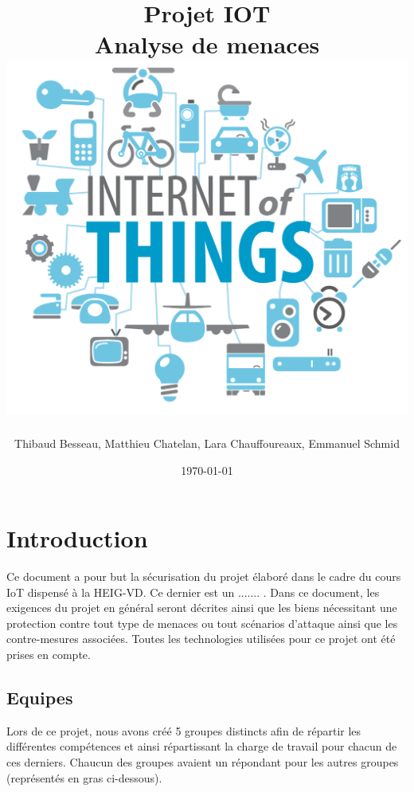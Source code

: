 \documentclass[12pt]{article}
\title{
  \vspace{-0.5cm}
  \huge{Projet IOT} \\
  \vspace{5mm}
  \Large{Analyse de menaces} \\
  \vspace{2.5cm}
  \includegraphics[width=.7\textwidth]{logo}
  \vspace{3cm}
}
\author{Thibaud Besseau, Matthieu Chatelan, Lara Chauffoureaux, Emmanuel Schmid}
\date{\today}
\begin{document}
\maketitle
\thispagestyle{empty}
\clearpage
\tableofcontents
\clearpage
\listoffigures
\clearpage
\headsep=20pt

\section{Introduction}
Ce document a pour but la sécurisation du projet élaboré dans le cadre du cours IoT dispensé à la HEIG-VD. Ce dernier est un ....... . Dans ce document, les exigences du projet en général seront décrites ainsi que les biens nécessitant une protection contre tout type de menaces ou tout scénarios d'attaque ainsi que les contre-mesures associées. Toutes les technologies utilisées pour ce projet ont été prises en compte.

\subsection{Equipes}
Lors de ce projet, nous avons créé 5 groupes distincts afin de répartir les différentes compétences et ainsi répartissant la charge de travail pour chacun de ces derniers. Chaucun des groupes avaient un répondant pour les autres groupes (représentés en gras ci-dessous).
\end{document}
